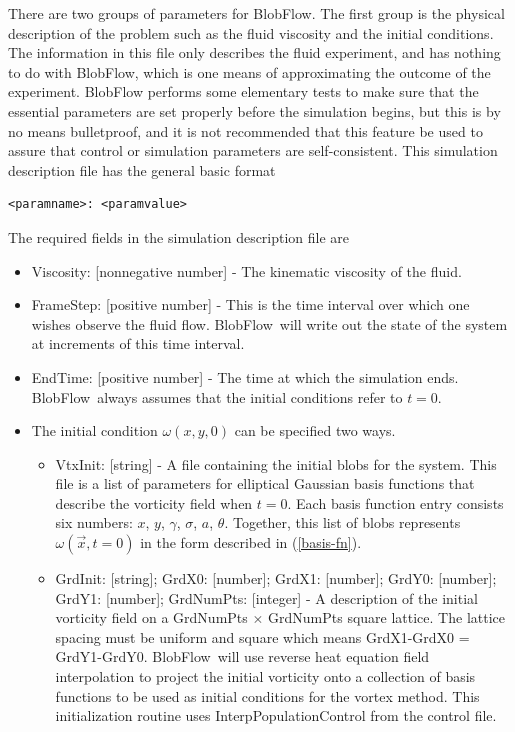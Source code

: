 \documentclass[12pt]{report}
\def\v#1{\vec{#1}}
\newcommand{\eqnn}[1]{(\ref{#1})}
\newcommand{\BF}{BlobFlow}
\begin{document}
There are two groups of parameters for \BF.  The first group is the
physical description of the problem such as the fluid viscosity and the
initial conditions.  The information in this file only describes the fluid
experiment, and has nothing to do with \BF, which is one means of
approximating the outcome of the experiment.  BlobFlow performs some
elementary tests to make sure that the essential parameters are set
properly before the simulation begins, but this is by no means
bulletproof, and it is not recommended that this feature be used to
assure that control or simulation parameters are self-consistent.
This simulation description file has the general basic format
\begin{verbatim}
<paramname>: <paramvalue>
\end{verbatim}
The required fields in the simulation description file are
\begin{itemize}

\item Viscosity: [nonnegative number] - The kinematic viscosity of the fluid.

\item FrameStep: [positive number] - This is the time interval over which one
wishes observe
the fluid flow.  \BF~will write out the state of the system at
increments of this time interval.

\item EndTime: [positive number] - The time at which the simulation ends. 
\BF~always
assumes that the initial conditions refer to $t=0$.

\item The initial condition $\omega(x,y,0)$ can be specified two ways.

\begin{itemize}

\item VtxInit: [string] - A file containing the initial blobs for the system.
This file is a list of parameters for elliptical Gaussian basis
functions that describe the vorticity field when $t=0$.  Each basis function
entry consists six numbers: $x$, $y$, $\gamma$, $\sigma$, $a$, $\theta$.
Together, this list of blobs represents $\omega (\v x,t=0)$ in the form
described in \eqnn{basis-fn}.

\item GrdInit: [string]; GrdX0: [number]; GrdX1: [number]; GrdY0: [number];
GrdY1: [number]; GrdNumPts: [integer] - A description of the initial vorticity
field on a GrdNumPts $\times$ GrdNumPts square lattice.  The lattice spacing
must be uniform and square which means GrdX1-GrdX0 = GrdY1-GrdY0.  \BF~will use
reverse heat equation field interpolation to project the initial vorticity onto
a collection of basis functions to be used as initial conditions for the vortex
method.  This initialization routine uses InterpPopulationControl from the
control file.

\end{itemize}

\end{itemize}
\end{document}
